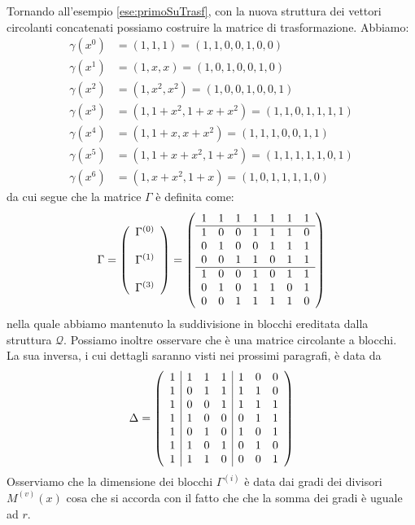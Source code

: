 \begin{esempio} \label{ese:secondoSuTrasf}
Tornando all'esempio \ref{ese:primoSuTrasf}, con la nuova struttura dei vettori circolanti concatenati possiamo costruire la matrice di trasformazione. Abbiamo:
\begin{align*}
  \gamma(x^0) &= (1,1,1) =  (1,1,0,0,1,0,0) \\
  \gamma(x^1) &= (1,x,x) = (1,0,1,0,0,1,0) \\
  \gamma(x^2) &= (1,x^2,x^2) = (1,0,0,1,0,0,1) \\
  \gamma(x^3) &= (1,1+x^2,1+x+x^2) = (1,1,0,1,1,1,1) \\
  \gamma(x^4) &= (1,1+x,x+x^2) = (1,1,1,0,0,1,1) \\
  \gamma(x^5) &= (1,1+x+x^2,1+x^2) = (1,1,1,1,1,0,1) \\
  \gamma(x^6) &= (1,x+x^2,1+x) = (1,0,1,1,1,1,0)
\end{align*}
da cui segue che la matrice $\Gamma$ è definita come:
\begin{align*}
\Gamma =
\left(
\begin{array} { c }
\Gamma^{(0)}  \\ \\
\Gamma^{(1)} \\ \\
\Gamma^{(3)}
\end{array}
\right)
=
\left(
\begin{array} { c c c c c c c c}
1 & 1 & 1 & 1 & 1 & 1 & 1  \\
\hline
1 & 0 & 0 & 1 & 1 & 1 & 0  \\
0 & 1 & 0 & 0 & 1 & 1 & 1  \\
0 & 0 & 1 & 1 & 0 & 1 & 1  \\
\hline
1 & 0 & 0 & 1 & 0 & 1 & 1  \\
0 & 1 & 0 & 1 & 1 & 0 & 1  \\
0 & 0 & 1 & 1 & 1 & 1 & 0
\end{array}
\right)
\end{align*}
nella quale abbiamo mantenuto la suddivisione in blocchi ereditata dalla struttura $\mathcal{Q}$.
Possiamo inoltre osservare che è una matrice circolante a blocchi.\\
La sua inversa, i cui dettagli saranno visti nei prossimi paragrafi, è data da
\begin{align*}
\Delta =
\left(
\begin{array} { c | c c c | c c c c}
1 & 1 & 1 & 1 & 1 & 0 & 0  \\
1 & 0 & 1 & 1 & 1 & 1 & 0  \\
1 & 0 & 0 & 1 & 1 & 1 & 1  \\
1 & 1 & 0 & 0 & 0 & 1 & 1  \\
1 & 0 & 1 & 0 & 1 & 0 & 1  \\
1 & 1 & 0 & 1 & 0 & 1 & 0  \\
1 & 1 & 1 & 0 & 0 & 0 & 1
\end{array}
\right)
\end{align*}
Osserviamo che la dimensione dei blocchi $\Gamma^{(i)}$ è data dai gradi dei divisori $M^{(v)}(x)$ cosa che si accorda con il fatto che che la somma dei gradi è uguale ad $r$.
\end{esempio}


